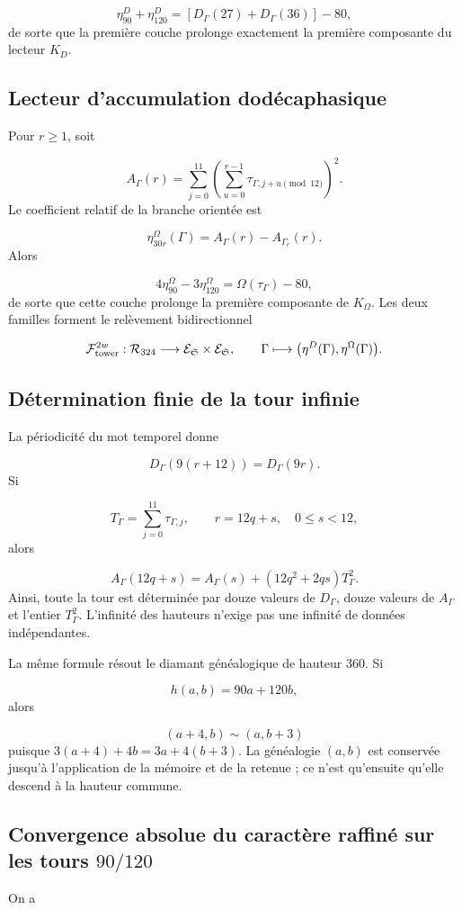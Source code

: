 \[
 \eta_{90}^{D}+\eta_{120}^{D}
 =[D_\Gamma(27)+D_\Gamma(36)]-80,
\]
de sorte que la première couche prolonge exactement la première composante du lecteur \(K_D\).

\subsection{Lecteur d'accumulation dodécaphasique}
Pour \(r\ge1\), soit

\[
 A_\Gamma(r)=
 \sum_{j=0}^{11}
 \left(
 \sum_{u=0}^{r-1}
 \tau_{\Gamma,j+u\!\!\!\pmod{12}}
 \right)^2.
\]
Le coefficient relatif de la branche orientée est

\[
 \boxed{\eta_{30r}^{\Omega}(\Gamma)
 =A_\Gamma(r)-A_{\Gamma_e}(r).}
\]
Alors

\[
 4\eta_{90}^{\Omega}-3\eta_{120}^{\Omega}
 =\Omega(\tau_\Gamma)-80,
\]
de sorte que cette couche prolonge la première composante de \(K_\Omega\). Les deux familles forment le relèvement bidirectionnel

\[
 \mathcal F_{\rm tower}^{2w}:
 \mathcal R_{324}\longrightarrow
 \mathcal E_{\mathfrak S}\times\mathcal E_{\mathfrak S},
 \qquad
 \Gamma\longmapsto
 \bigl(\eta^D(\Gamma),\eta^\Omega(\Gamma)\bigr).
\]
\subsection{Détermination finie de la tour infinie}
La périodicité du mot temporel donne

\[
 D_\Gamma(9(r+12))=D_\Gamma(9r).
\]
Si

\[
 T_\Gamma=\sum_{j=0}^{11}\tau_{\Gamma,j},
 \qquad r=12q+s,\quad 0\le s<12,
\]
alors

\[
 A_\Gamma(12q+s)
 =A_\Gamma(s)+(12q^2+2qs)T_\Gamma^2.
\]
Ainsi, toute la tour est déterminée par douze valeurs de \(D_\Gamma\), douze valeurs de \(A_\Gamma\) et l'entier \(T_\Gamma^2\). L'infinité des hauteurs n'exige pas une infinité de données indépendantes.

La même formule résout le diamant généalogique de hauteur 360. Si

\[
 h(a,b)=90a+120b,
\]
alors

\[
 (a+4,b)\sim(a,b+3)
\]
puisque \(3(a+4)+4b=3a+4(b+3)\). La généalogie \((a,b)\) est conservée jusqu'à l'application de la mémoire et de la retenue ; ce n'est qu'ensuite qu'elle descend à la hauteur commune.

\subsection{Convergence absolue du caractère raffiné sur les tours \(90/120\)}
On a

